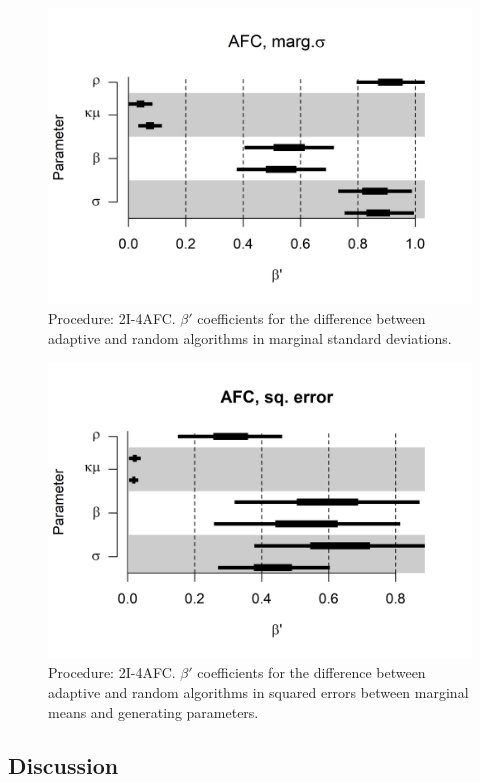\documentclass{article}\usepackage{knitr}
\begin{document}
\begin{figure}[H]
\centering
\includegraphics[scale=0.75]{qs_AFC_SD}
\caption{Procedure: 2I-4AFC. $\beta'$ coefficients for the difference between adaptive and random algorithms in marginal standard deviations.}
\label{fig:qs_AFC_SD}
\end{figure} 

\begin{figure}[H]
\centering
\includegraphics[scale=0.75]{qs_AFC_sq_error}
\caption{Procedure: 2I-4AFC. $\beta'$ coefficients for the difference between adaptive and random algorithms in squared errors between marginal means and generating parameters.}
\label{fig:qs_AFC_sq_error}
\end{figure} 

\subsection{Discussion}
\end{document}
